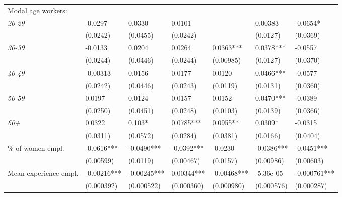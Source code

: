 \documentclass[Review,times,sageh,11pt]{sagej}
\begin{document}
\begin{table}[hbt]
{\begin{threeparttable}
\begin{tabular}{l*{6}{l}}
\cmidrule(lr){1-7}
Modal age workers:                          \\[1ex]
\quad \textit{20-29}                        &       -0.0297     & 0.0330      & 0.0101     &             & 0.00383    & -0.0654*     \\
                                            &       (0.0242)    & (0.0455)    & (0.0242)   &             & (0.0127)   & (0.0369)     \\[1ex]
\quad \textit{30-39}                        &       -0.0133     & 0.0204      & 0.0264     & 0.0363***   & 0.0378***  & -0.0557      \\
                                            &       (0.0244)    & (0.0446)    & (0.0244)   & (0.00985)   & (0.0127)   & (0.0370)     \\[1ex]
\quad \textit{40-49}                        &       -0.00313    & 0.0156      & 0.0177     & 0.0120      & 0.0466***  & -0.0577      \\
                                            &       (0.0242)    & (0.0446)    & (0.0243)   & (0.0119)    & (0.0131)   & (0.0360)     \\[1ex]
\quad \textit{50-59}                        &       0.0197      & 0.0124      & 0.0157     & 0.0152      & 0.0470***  & -0.0389      \\
                                            &       (0.0250)    & (0.0451)    & (0.0248)   & (0.0103)    & (0.0139)   & (0.0366)     \\[1ex]
\quad \textit{60+}                          &       0.0322      & 0.103*      & 0.0785***  & 0.0955**    & 0.0309*    & -0.0315      \\
                                            &       (0.0311)    & (0.0572)    & (0.0284)   & (0.0381)    & (0.0166)   & (0.0404)     \\[1ex]
\% of women empl.                           &       -0.0616***  & -0.0490***  & -0.0392*** & -0.0230     & -0.0386*** & -0.0451***   \\
                                            &       (0.00599)   & (0.0119)    & (0.00467)  & (0.0157)    & (0.00986)  & (0.00603)    \\[1ex]
Mean experience empl.                       &       -0.00216*** & -0.00245*** & 0.00344*** & -0.00468*** & -5.36e-05  & -0.000761*** \\
                                            &       (0.000392)  & (0.000522)  & (0.000360) & (0.000980)  & (0.000576) & (0.000287)   \\[1ex]

\end{tabular}
\end{threeparttable}}
\end{table}
\end{document}
